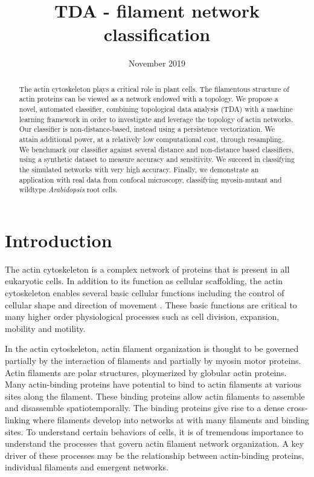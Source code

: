 \documentclass[10pt]{article}
\title{TDA - filament network classification}
\date{November 2019}
\begin{document}
\maketitle

\begin{abstract}

The actin cytoskeleton plays a critical role in plant cells. The filamentous structure of actin proteins can be viewed as a network endowed with a topology. We propose a novel, automated classifier, combining topological data analysis (TDA) with a machine learning framework in order to investigate and leverage the topology of actin networks. Our classifier is non-distance-based, instead using a persistence vectorization. We attain additional power, at a relatively low computational cost, through resampling. We benchmark our classifier against several distance and non-distance based classifiers, using a synthetic dataset to measure accuracy and sensitivity. We succeed in classifying the simulated networks with very high accuracy. Finally, we demonstrate an application with real data from confocal microscopy, classifying myosin-mutant and wildtype \textit{Arabidopsis} root cells.

    
\end{abstract}

\section{Introduction}
The actin cytoskeleton is a complex network of proteins that is present in all eukaryotic cells. In addition to its function as cellular scaffolding, the actin cytoskeleton enables several basic cellular functions including the control of cellular shape and direction of movement \cite{thomas2009actin}. These basic functions are critical to many higher order physiological processes such as cell division, expansion, mobility and motility\cite{freedman2017versatile}. 

In the actin cytoskeleton, actin filament organization is thought to be governed partially by the interaction of filaments and partially by myosin motor proteins. Actin filaments are polar structures, ploymerized by globular actin proteins. Many actin-binding proteins have potential to bind to actin filaments at various sites along the filament. These binding proteins allow actin filaments to assemble and disassemble spatiotemporally. The binding proteins give rise to a dense cross-linking where filaments develop into networks at with many filaments and binding sites. To understand certain behaviors of cells, it is of tremendous importance to understand the processes that govern actin filament network organization. A key driver of these processes may be the relationship between actin-binding proteins, individual filaments and emergent networks.
\end{document}

